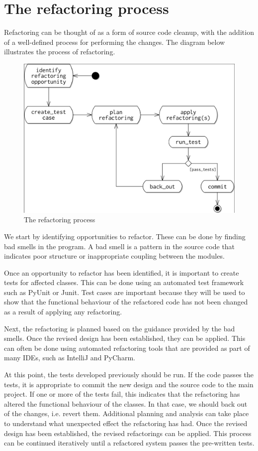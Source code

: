 \documentclass[a4paper, openany]{memoir}
\begin{document}
\section{The refactoring process}
Refactoring can be thought of as a form of source code cleanup, with the addition of a well-defined process for performing the changes. The diagram below illustrates the process of refactoring.
\begin{figure}[H]
    \centering
    \includegraphics[scale=0.3]{src/16.1 refactoring process.png}
    \caption{The refactoring process}
\end{figure}
We start by identifying opportunities to refactor. These can be done by finding bad smells in the program. A bad smell is a pattern in the source code that indicates poor structure or inappropriate coupling between the modules.

Once an opportunity to refactor has been identified, it is important to create tests for affected classes. This can be done using an automated test framework such as PyUnit or Junit. Test cases are important because they will be used to show that the functional behaviour of the refactored code has not been changed as a result of applying any refactoring. 

Next, the refactoring is planned based on the guidance provided by the bad smells. Once the revised design has been established, they can be applied. This can often be done using automated refactoring tools that are provided as part of many IDEs, such as IntelliJ and PyCharm.

At this point, the tests developed previously should be run. If the code passes the tests, it is appropriate to commit the new design and the source code to the main project. If one or more of the tests fail, this indicates that the refactoring has altered the functional behaviour of the classes. In that case, we should back out of the changes, i.e. revert them. Additional planning and analysis can take place to understand what unexpected effect the refactoring has had. Once the revised design has been established, the revised refactorings can be applied. This process can be continued iteratively until a refactored system passes the pre-written tests.
\end{document}
